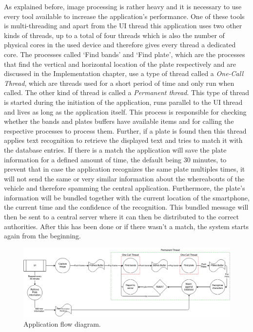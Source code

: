As explained before, image processing is rather heavy and it is necessary to use every tool available to increase the application's performance. One of these tools is multi-threading and apart from the UI thread this application uses two other kinds of threads, up to a total of four threads which is also the number of physical cores in the used device and therefore gives every thread a dedicated core. The processes called `Find bands' and `Find plate', which are the processes that find the vertical and horizontal location of the plate respectively and are discussed in the Implementation chapter, use a type of thread called a \emph{One-Call Thread}, which are threads used for a short period of time and only run when called. The other kind of thread is called a \emph{Permanent thread}. This type of thread is started during the initiation of the application, runs parallel to the UI thread and lives as long as the application itself. This process is responsible for checking whether the bands and plates buffers have available items and for calling the respective processes to process them. Further, if a plate is found then this thread applies text recognition to retrieve the displayed text and tries to match it with the database entries. If there is a match the application will save the plate information for a defined amount of time, the default being 30 minutes, to prevent that in case the application recognizes the same plate multiples times, it will not send the same or very similar information about the whereabouts of the vehicle and therefore spamming the central application. Furthermore, the plate's information will be bundled together with the current location of the smartphone, the current time and the confidence of the recognition. This bundled message will then be sent to a central server where it can then be distributed to the correct authorities. After this has been done or if there wasn't a match, the system starts again from the beginning.


\begin{figure}[ht]
    \centering
    \includegraphics[width=\textwidth]{plaatjes/architecture-RoadEye-parallel}
    \caption{Application flow diagram.}
    \label{fig:architecture}
\end{figure}%

